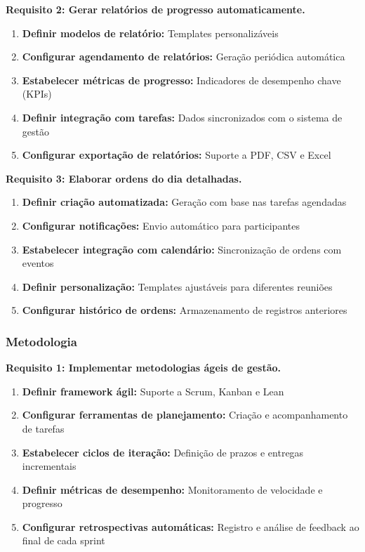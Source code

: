 \textbf{Requisito 2: Gerar relatórios de progresso automaticamente.}
\begin{enumerate}[leftmargin=*]
    \item \textbf{Definir modelos de relatório:} Templates personalizáveis
    \item \textbf{Configurar agendamento de relatórios:} Geração periódica automática
    \item \textbf{Estabelecer métricas de progresso:} Indicadores de desempenho chave (KPIs)
    \item \textbf{Definir integração com tarefas:} Dados sincronizados com o sistema de gestão
    \item \textbf{Configurar exportação de relatórios:} Suporte a PDF, CSV e Excel
\end{enumerate}

\textbf{Requisito 3: Elaborar ordens do dia detalhadas.}
\begin{enumerate}[leftmargin=*]
    \item \textbf{Definir criação automatizada:} Geração com base nas tarefas agendadas
    \item \textbf{Configurar notificações:} Envio automático para participantes
    \item \textbf{Estabelecer integração com calendário:} Sincronização de ordens com eventos
    \item \textbf{Definir personalização:} Templates ajustáveis para diferentes reuniões
    \item \textbf{Configurar histórico de ordens:} Armazenamento de registros anteriores
\end{enumerate}

\subsubsection{Metodologia}
\textbf{Requisito 1: Implementar metodologias ágeis de gestão.}
\begin{enumerate}[leftmargin=*]
    \item \textbf{Definir framework ágil:} Suporte a Scrum, Kanban e Lean
    \item \textbf{Configurar ferramentas de planejamento:} Criação e acompanhamento de tarefas
    \item \textbf{Estabelecer ciclos de iteração:} Definição de prazos e entregas incrementais
    \item \textbf{Definir métricas de desempenho:} Monitoramento de velocidade e progresso
    \item \textbf{Configurar retrospectivas automáticas:} Registro e análise de feedback ao final de cada sprint
\end{enumerate}

